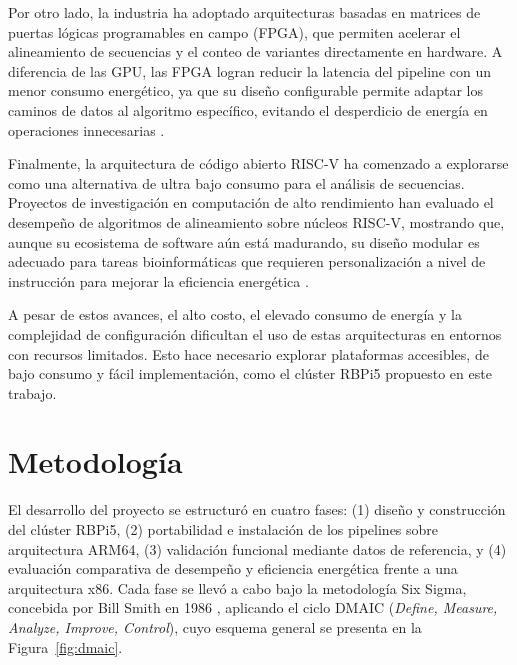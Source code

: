 \documentclass[12pt,oneside,spanish]{book}
\begin{document}
    Por otro lado, la industria ha adoptado arquitecturas basadas en matrices de puertas lógicas programables en campo (FPGA), que permiten acelerar el alineamiento de secuencias y el conteo de variantes directamente en hardware. A diferencia de las GPU, las FPGA logran reducir la latencia del pipeline con un menor consumo energético, ya que su diseño configurable permite adaptar los caminos de datos al algoritmo específico, evitando el desperdicio de energía en operaciones innecesarias \citep{robinson2021hardware}.
    
    Finalmente, la arquitectura de código abierto RISC-V \citep{gomezsanchez2023riscv} ha comenzado a explorarse como una alternativa de ultra bajo consumo para el análisis de secuencias. Proyectos de investigación en computación de alto rendimiento han evaluado el desempeño de algoritmos de alineamiento sobre núcleos RISC-V, mostrando que, aunque su ecosistema de software aún está madurando, su diseño modular es adecuado para tareas bioinformáticas que requieren personalización a nivel de instrucción para mejorar la eficiencia energética \citep{gomezsanchez2023riscv, pyrhonen2025energy}.
    
    A pesar de estos avances, el alto costo, el elevado consumo de energía y la complejidad de configuración dificultan el uso de estas arquitecturas en entornos con recursos limitados. Esto hace necesario explorar plataformas accesibles, de bajo consumo y fácil implementación, como el clúster RBPi5 propuesto en este trabajo.
    
    
    \chapter{Metodología}
    \label{cap:metodologia}
    
    El desarrollo del proyecto se estructuró en cuatro fases: (1) diseño y construcción del clúster RBPi5, (2) portabilidad e instalación de los pipelines sobre arquitectura ARM64, (3) validación funcional mediante datos de referencia, y (4) evaluación comparativa de desempeño y eficiencia energética frente a una arquitectura x86. Cada fase se llevó a cabo bajo la metodología Six Sigma, concebida por Bill Smith en 1986 \citep{purdue2021sixsigma}, aplicando el ciclo DMAIC (\textit{Define, Measure, Analyze, Improve, Control}), cuyo esquema general se presenta en la Figura~\ref{fig:dmaic}.
    
\end{document}
